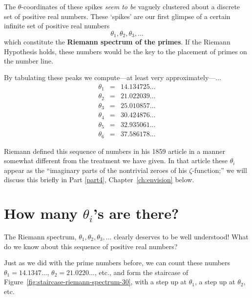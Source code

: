 \documentclass[openany]{book}
\theoremstyle{plain}
\theoremstyle{definition}
\begin{document}
{%

The $\theta$-coordinates of these spikes  {\it seem to be}
vaguely clustered about a discrete set of positive real numbers.
These `spikes' are our first glimpse of a
certain infinite set of positive real numbers
 $$\theta_1,\theta_2,\theta_3,\dots$$ which constitute the {\bf Riemann spectrum of
  the primes}. If the Riemann Hypothesis holds, these numbers would
be the key to the placement of primes on the number line.








By tabulating these peaks we compute---at least very approximately---$\dots$
\begin{eqnarray*}
\theta_1 &=& 14.134725 \dots\\
\theta_2 &=& 21.022039 \dots\\
\theta_3 &=& 25.010857 \dots\\
\theta_4 &=& 30.424876 \dots\\
\theta_5 &=& 32.935061 \dots\\
\theta_6 &=& 37.586178 \dots
\end{eqnarray*}

Riemann defined this sequence of numbers in his 1859 article in a
manner somewhat different from the treatment we have given.  In that
article these $\theta_i$ appear as the ``imaginary parts of the
nontrivial zeroes of his $\zeta$-function;'' we will discuss this
briefly in Part \ref{part4}, Chapter~\ref{ch:envision} below.




\chapter{ How many $\theta_i$'s are there?}

  The Riemann spectrum, $\theta_1, \theta_2, \theta_3, \dots$ clearly deserves to be well understood!  What do we know about this sequence of positive real numbers?

Just as we did with the prime numbers before, we can count
these numbers $\theta_1=14.1347\ldots$,
$\theta_2=21.0220\ldots$, etc., and form the staircase
of Figure~\ref{fig:staircase-riemann-spectrum-30},
with a step up at $\theta_1$, a step up at $\theta_2$, etc.

}
\end{document}
